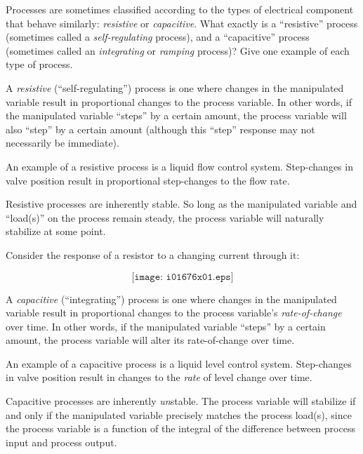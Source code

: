 

Processes are sometimes classified according to the types of electrical component that behave similarly: {\it resistive} or {\it capacitive}.  What exactly is a ``resistive'' process (sometimes called a {\it self-regulating} process), and a ``capacitive'' process (sometimes called an {\it integrating} or {\it ramping} process)?  Give one example of each type of process.







A {\it resistive} (``self-regulating'') process is one where changes in the manipulated variable result in proportional changes to the process variable.  In other words, if the manipulated variable ``steps'' by a certain amount, the process variable will also ``step'' by a certain amount (although this ``step'' response may not necessarily be immediate).

An example of a resistive process is a liquid flow control system.  Step-changes in valve position result in proportional step-changes to the flow rate.
 
Resistive processes are inherently stable.  So long as the manipulated variable and ``load(s)'' on the process remain steady, the process variable will naturally stabilize at some point.
 
Consider the response of a resistor to a changing current through it:

$$\texttt{[image: i01676x01.eps]}$$

\vskip 10pt

\filbreak

A {\it capacitive} (``integrating'') process is one where changes in the manipulated variable result in proportional changes to the process variable's {\it rate-of-change} over time.  In other words, if the manipulated variable ``steps'' by a certain amount, the process variable will alter its rate-of-change over time.

An example of a capacitive process is a liquid level control system.  Step-changes in valve position result in changes to the {\it rate} of level change over time.

Capacitive processes are inherently {\it un}stable.  The process variable will stabilize if and only if the manipulated variable precisely matches the process load(s), since the process variable is a function of the integral of the difference between process input and process output.


